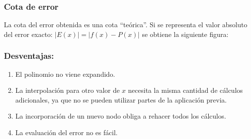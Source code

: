 \documentclass{beamer}
\begin{document}
{
\frametitle{Cota de error}
La cota del error obtenida es una cota ``te\'orica''. Si se representa el valor absoluto del error exacto: $|E(x) | = | f(x) - P(x)|$ se obtiene la siguiente figura:
}
\frame
{
\frametitle{Desventajas:}
\begin{enumerate}
 \item<1-> El polinomio no viene expandido.
 \item<2-> La interpolaci\'on para otro valor de $x$ necesita la misma cantidad de c\'alculos adicionales, ya que no se pueden utilizar partes de la aplicaci\'on previa.
 \item<3-> La incorporaci\'on de un nuevo nodo obliga a rehacer todos los c\'alculos.
 \item<4-> La evaluaci\'on del error no es f\'acil.
\end{enumerate}
}
\frame
\end{document}
